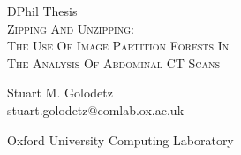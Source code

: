 \begin{titlepage}

\begin{center}

\vspace*{5cm}

\normalsize DPhil Thesis\\
\LARGE \textsc{Zipping And Unzipping:\\The Use Of Image Partition Forests In\\The Analysis Of Abdominal CT Scans}\\

\vspace{2mm}


\vspace{-5mm}

\large Stuart M. Golodetz\\
\small stuart.golodetz@comlab.ox.ac.uk\\

\vspace{2mm}

\small Oxford University Computing Laboratory

\end{center}

\end{titlepage}
